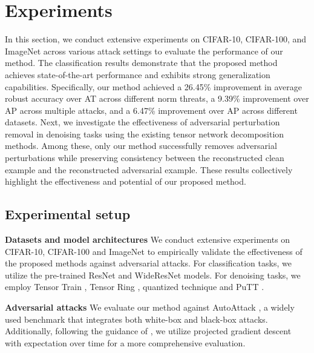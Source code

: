 

\section{Experiments}
\label{Experiments}
\renewcommand{\arraystretch}{0.8}

In this section, we conduct extensive experiments on CIFAR-10, CIFAR-100, and ImageNet across various attack settings to evaluate the performance of our method. The classification results demonstrate that the proposed method achieves state-of-the-art performance and exhibits strong generalization capabilities.
Specifically, our method achieved a 26.45\% improvement in average robust accuracy over AT across different norm threats, a 9.39\% improvement over AP across multiple attacks, and a 6.47\% improvement over AP across different datasets.
Next, we investigate the effectiveness of adversarial perturbation removal in denoising tasks using the existing tensor network decomposition methods. Among these, only our method successfully removes adversarial perturbations while preserving consistency between the reconstructed clean example and the reconstructed adversarial example.
These results collectively highlight the effectiveness and potential of our proposed method.



\subsection{Experimental setup}
\textbf{Datasets and model architectures} \quad We conduct extensive experiments on CIFAR-10, CIFAR-100 \citep{krizhevsky2009learning} and ImageNet \citep{deng2009imagenet} to empirically validate the effectiveness of the proposed methods against adversarial attacks. For classification tasks, we utilize the pre-trained ResNet \citep{he2016deep} and WideResNet \citep{zagoruyko2016wide} models. For denoising tasks, we employ Tensor Train \citep[TT,][]{oseledets2011tensor}, Tensor Ring \citep[TR,][]{zhao2016tensor}, quantized technique \citep{khoromskij2011d} and PuTT \citep{loeschcke2024coarse}.

\textbf{Adversarial attacks} \quad We evaluate our method against AutoAttack \citep{croce2020reliable}, a widely used benchmark that integrates both white-box and black-box attacks. Additionally, following the guidance of \citet{lee2023robust}, we utilize projected gradient descent \citep[PGD,][]{madry2018towards} with expectation over time \citep[EOT,][]{athalye2018synthesizing} for a more comprehensive evaluation.

